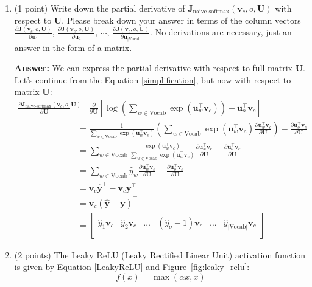 \documentclass{article}
\newenvironment{answer}{
    {\bf Answer:} \sf \begingroup\color{red}
}{\endgroup}%
\begin{document}
\begin{enumerate}[label=(\alph*)]
\item (1 point) Write down the partial derivative of $\bm J_{\text{naive-softmax}}(\bm v_c, o, \bm U)$ with respect to $\bm U$. Please break down your answer in terms of the column vectors $\frac{\partial \bm J(\bm v_c, o, \bm U)}{\partial \bm u_1}$, $\frac{\partial \bm J(\bm v_c, o, \bm U)}{\partial \bm u_2}$, $\cdots$, $\frac{\partial \bm J(\bm v_c, o, \bm U)}{\partial \bm u_{|\text{Vocab}|}}$. No derivations are necessary, just an answer in the form of a matrix.

\begin{shaded}
\begin{answer} We can express the partial derivative with respect to full matrix $\bm U$. Let's continue from the Equation \ref{simplification}, but now with respect to matrix $\bm U$: 
\begin{align}
\frac{\partial \bm J_{\text{naive-softmax}}(\bm v_c, o, \bm U)}{\partial \bm U} &= \frac{\partial}{\partial \bm U} \left[\log\left(\sum_{w \in \text{Vocab}} \exp(\bm u_{w}^\top \bm v_c)\right)-\bm u_{o}^\top \bm v_c\right] \\
&=\frac{1}{\sum_{w \in \text{Vocab}} \exp(\bm u_{w}^\top \bm v_c)}\left(\sum_{w \in \text{Vocab}} \exp(\bm u_{w}^\top \bm v_c) \frac{\partial \bm u_w^\top \bm v_c}{\partial \bm U}\right) - \frac{\partial \bm u_o^\top \bm v_c}{\partial \bm U} \\
&= \sum_{w \in \text{Vocab}} \frac{\exp(\bm u_{w}^\top \bm v_c)}{\sum_{w \in \text{Vocab}} \exp(\bm u_{w}^\top \bm v_c)} \frac{\partial \bm u_w^\top \bm v_c}{\partial \bm U} - \frac{\partial \bm u_o^\top \bm v_c}{\partial \bm U} \\
&= \sum_{w \in \text{Vocab}} \hat{y}_w \frac{\partial \bm u_w^\top \bm v_c}{\partial \bm U} - \frac{\partial \bm u_o^\top \bm v_c}{\partial \bm U} \\
&= \bm v_c \hat{\bm y}^\top - \bm v_c \bm y^\top \\
&= \bm v_c (\hat{\bm y} - \bm y)^\top \\
&= 
\begin{bmatrix} 
    \hat{y}_1 \bm v_c & \hat{y}_2 \bm v_c & \ldots & (\hat{y}_o - 1) \bm v_c & \ldots & \hat{y}_{|\text{Vocab}|} \bm v_c \\
\end{bmatrix}
\end{align}
\end{answer}
\end{shaded}

\item (2 points) The Leaky ReLU (Leaky Rectified Linear Unit) activation function is given by Equation \ref{LeakyReLU} and Figure~\ref{fig:leaky_relu}:
\begin{equation}
    \label{LeakyReLU}
    f(x) = \max(\alpha x, x)
\end{equation}


\end{enumerate}
\end{document}
